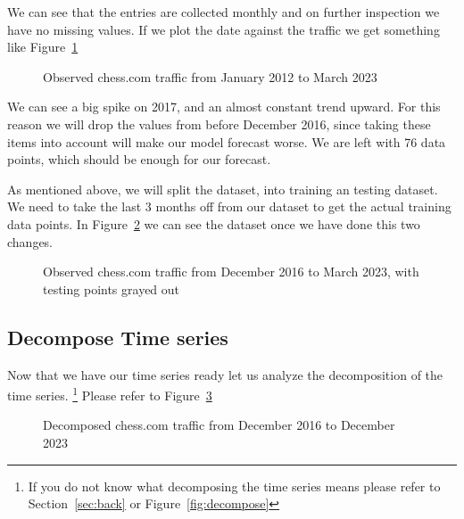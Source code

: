 \documentclass[journal]{IEEEtran}
\begin{document}
We can see that the entries are collected monthly and on further inspection we
have no missing values. If we plot the date against the traffic we get
something like Figure~\ref{fig:obs}

\begin{figure}[htbp]
  \centering
  
    \caption{Observed chess.com traffic from January 2012 to March 2023}
  \label{fig:obs}
\end{figure}

We can see a big spike on 2017, and an almost constant trend upward. For this
reason we will drop the values from before December 2016, since taking these
items into account will make our model forecast worse. We are left with 76
data points, which should be enough for our forecast.

As mentioned above, we will split the dataset, into training an testing
dataset. We need to take the last 3 months off from our dataset to get the
actual training data points. In Figure~\ref{fig:obs-2} we can see the dataset
once we have done this two changes.

\begin{figure}[htbp]
  \centering
  
    \caption{Observed chess.com traffic from December 2016 to March 2023, with
        testing points grayed out}
    \label{fig:obs-2}
\end{figure}

\subsection{Decompose Time series}\label{sub:decompose-time-series}

Now that we have our time series ready let us analyze the decomposition of the
time series. \footnote{If you do not know what decomposing the time series
means please refer to Section~\ref{sec:back} or Figure~\ref{fig:decompose}}
Please refer to Figure~\ref{fig:decom-chess}

\begin{figure}[htbp]
  \centering
  
    \caption{Decomposed chess.com traffic from December 2016 to December 2023}
    \label{fig:decom-chess}
\end{figure}
\end{document}
